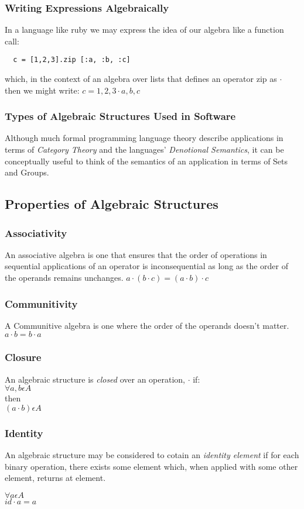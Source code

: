 \documentclass{beamer}
\begin{document}
\begin{frame} [fragile]
  \frametitle{Writing Expressions Algebraically}
  In a language like ruby we may express the idea of our algebra like a function call:
  \begin{verbatim}
  c = [1,2,3].zip [:a, :b, :c]
\end{verbatim}
  which, in the context of an algebra over lists that defines an operator zip as $\cdot$ then we might write:
  $c = { 1, 2, 3 } \cdot { a, b, c}$
\end{frame}

\begin{frame}
  \frametitle{Types of Algebraic Structures Used in Software}

  Although much formal programming language theory describe
  applications in terms of \emph{Category Theory} and the languages'
  \emph{Denotional Semantics}, it can be conceptually useful to think
  of the semantics of an application in terms of Sets and Groups.
\end{frame}

\subsection{Properties of Algebraic Structures}

\begin{frame}
  \frametitle{Associativity}
  An associative algebra is one that ensures that the order of
  operations in sequential applications of an operator is
  inconsequential as long as the order of the operands remains
  unchanges.
  $ a \cdot ( b \cdot c) = ( a \cdot b ) \cdot c $
\end{frame}

\begin{frame}
  \frametitle{Communitivity}
  A Communitive algebra is one where the order of the operands doesn't matter.
  $ a \cdot b = b \cdot a$
\end{frame}

\begin{frame}
  \frametitle{Closure}
  An algebraic structure is \emph{closed} over an operation, $\cdot$ if: \\
  $\forall a, b \epsilon A$ \\then \\$(a \cdot b) \epsilon A$
\end{frame}

\begin{frame} [fragile]
  \frametitle{Identity}
  An algebraic structure may be considered to cotain an \emph{identity
    element} if for each binary operation, there exists some element
  which, when applied with some other element, returns at element.
  \begin{center}
  $\forall a \epsilon A$\\
  $id \cdot a = a $
  \end{center}
\end{frame}
\end{document}
